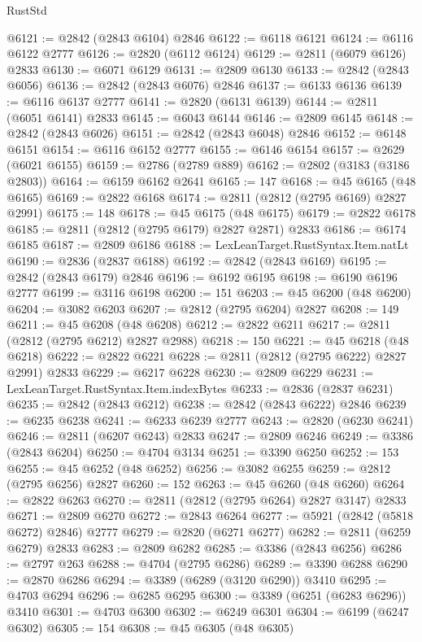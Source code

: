 \begin{lexlean}{RustStd}
\begin{coremodule}
@6121 := @2842 (@2843 @6104) @2846
@6122 := @6118 @6121
@6124 := @6116 @6122 @2777
@6126 := @2820 (@6112 @6124)
@6129 := @2811 (@6079 @6126) @2833
@6130 := @6071 @6129
@6131 := @2809 @6130
@6133 := @2842 (@2843 @6056)
@6136 := @2842 (@2843 @6076) @2846
@6137 := @6133 @6136
@6139 := @6116 @6137 @2777
@6141 := @2820 (@6131 @6139)
@6144 := @2811 (@6051 @6141) @2833
@6145 := @6043 @6144
@6146 := @2809 @6145
@6148 := @2842 (@2843 @6026)
@6151 := @2842 (@2843 @6048) @2846
@6152 := @6148 @6151
@6154 := @6116 @6152 @2777
@6155 := @6146 @6154
@6157 := @2629 (@6021 @6155)
@6159 := @2786 (@2789 @889)
@6162 := @2802 (@3183 (@3186 @2803))
@6164 := @6159 @6162 @2641
@6165 := 147
@6168 := @45 @6165 (@48 @6165)
@6169 := @2822 @6168
@6174 := @2811 (@2812 (@2795 @6169) @2827 @2991)
@6175 := 148
@6178 := @45 @6175 (@48 @6175)
@6179 := @2822 @6178
@6185 := @2811 (@2812 (@2795 @6179) @2827 @2871) @2833
@6186 := @6174 @6185
@6187 := @2809 @6186
@6188 := LexLeanTarget.RustSyntax.Item.natLt
@6190 := @2836 (@2837 @6188)
@6192 := @2842 (@2843 @6169)
@6195 := @2842 (@2843 @6179) @2846
@6196 := @6192 @6195
@6198 := @6190 @6196 @2777
@6199 := @3116 @6198
@6200 := 151
@6203 := @45 @6200 (@48 @6200)
@6204 := @3082 @6203
@6207 := @2812 (@2795 @6204) @2827
@6208 := 149
@6211 := @45 @6208 (@48 @6208)
@6212 := @2822 @6211
@6217 := @2811 (@2812 (@2795 @6212) @2827 @2988)
@6218 := 150
@6221 := @45 @6218 (@48 @6218)
@6222 := @2822 @6221
@6228 := @2811 (@2812 (@2795 @6222) @2827 @2991) @2833
@6229 := @6217 @6228
@6230 := @2809 @6229
@6231 := LexLeanTarget.RustSyntax.Item.indexBytes
@6233 := @2836 (@2837 @6231)
@6235 := @2842 (@2843 @6212)
@6238 := @2842 (@2843 @6222) @2846
@6239 := @6235 @6238
@6241 := @6233 @6239 @2777
@6243 := @2820 (@6230 @6241)
@6246 := @2811 (@6207 @6243) @2833
@6247 := @2809 @6246
@6249 := @3386 (@2843 @6204)
@6250 := @4704 @3134
@6251 := @3390 @6250
@6252 := 153
@6255 := @45 @6252 (@48 @6252)
@6256 := @3082 @6255
@6259 := @2812 (@2795 @6256) @2827
@6260 := 152
@6263 := @45 @6260 (@48 @6260)
@6264 := @2822 @6263
@6270 := @2811 (@2812 (@2795 @6264) @2827 @3147) @2833
@6271 := @2809 @6270
@6272 := @2843 @6264
@6277 := @5921 (@2842 (@5818 @6272) @2846) @2777
@6279 := @2820 (@6271 @6277)
@6282 := @2811 (@6259 @6279) @2833
@6283 := @2809 @6282
@6285 := @3386 (@2843 @6256)
@6286 := @2797 @263
@6288 := @4704 (@2795 @6286)
@6289 := @3390 @6288
@6290 := @2870 @6286
@6294 := @3389 (@6289 (@3120 @6290)) @3410
@6295 := @4703 @6294
@6296 := @6285 @6295
@6300 := @3389 (@6251 (@6283 @6296)) @3410
@6301 := @4703 @6300
@6302 := @6249 @6301
@6304 := @6199 (@6247 @6302)
@6305 := 154
@6308 := @45 @6305 (@48 @6305)

\end{coremodule}
\end{lexlean}
